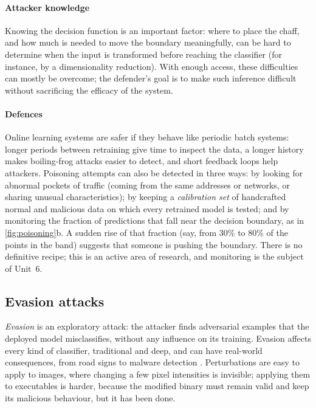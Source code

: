 \paragraph{Attacker knowledge} Knowing the decision function is an important factor: where to place the
chaff, and how much is needed to move the boundary meaningfully, can be hard to determine when the input
is transformed before reaching the classifier (for instance, by a dimensionality reduction). With enough
access, these difficulties can mostly be overcome; the defender's goal is to make such inference
difficult without sacrificing the efficacy of the system.

\paragraph{Defences} Online learning systems are safer if they behave
like periodic batch systems: longer periods between retraining give time to inspect the data, a longer
history makes boiling-frog attacks easier to detect, and short feedback loops help attackers.
Poisoning attempts can also be detected in three ways: by looking for abnormal pockets of traffic (coming from the same
addresses or networks, or sharing unusual characteristics); by keeping a \emph{calibration set} of
handcrafted normal and malicious data on which every retrained model is tested; and by monitoring the
fraction of predictions that fall near the decision boundary, as in \cref{fig:poisoning}b. A sudden rise
of that fraction (say, from 30\% to 80\% of the points in the band) suggests that someone is pushing the boundary. There is
no definitive recipe; this is an active area of research, and monitoring is the subject of Unit~6.

\subsection{Evasion attacks}

\emph{Evasion} is an exploratory attack: the attacker finds adversarial examples that the deployed model
misclassifies, without any influence on its training. Evasion affects every kind of classifier,
traditional and deep, and can have real-world consequences, from road signs to malware detection
\citep{biggio2013evasion}. Perturbations are easy to apply to images, where changing a few pixel
intensities is invisible; applying them to executables is harder, because the modified binary must remain
valid and keep its malicious behaviour, but it has been done.


